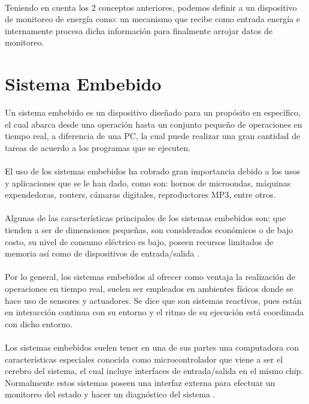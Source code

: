 \paragraph{}
Teniendo en cuenta los 2 conceptos anteriores, podemos definir a un dispositivo de monitoreo de energía como: un mecanismo que recibe como entrada energía e internamente procesa dicha información para finalmente arrojar datos de monitoreo.


\section{Sistema Embebido}
Un sistema embebido es un dispositivo diseñado para un propósito en específico, el cual abarca desde una operación hasta un conjunto pequeño de operaciones en tiempo real, a diferencia de una PC, la cual puede realizar una gran cantidad de tareas de acuerdo a los programas que se ejecuten. 
\paragraph{}
El uso de los sistemas embebidos ha cobrado gran importancia debido a los usos y aplicaciones que se le han dado, como son: hornos de microondas, máquinas expendedoras, routers, cámaras digitales, reproductores MP3, entre otros. 
\paragraph{}
Algunas de las características principales de los sistemas embebidos son: que tienden a ser de dimensiones pequeñas, son considerados económicos o de bajo costo, su nivel de consumo eléctrico es bajo, poseen recursos limitados de memoria así como de dispositivos de entrada/salida \citep{MarcoTeorico14}.
\paragraph{}
Por lo general, los sistemas embebidos al ofrecer como ventaja la realización de operaciones en tiempo real, suelen ser empleados en ambientes físicos donde se hace uso de sensores y actuadores. Se dice que son sistemas reactivos, pues están en interacción continua con su entorno y el ritmo de su ejecución está coordinada con dicho entorno. 
\paragraph{}
Los sistemas embebidos suelen tener en una de sus partes una computadora con características especiales conocida como microcontrolador que viene a ser el cerebro del sistema, el cual incluye interfaces de entrada/salida en el mismo chip. Normalmente estos sistemas poseen una interfaz externa para efectuar un monitoreo del estado y hacer un diagnóstico del sistema \citep{MarcoTeorico15}.
